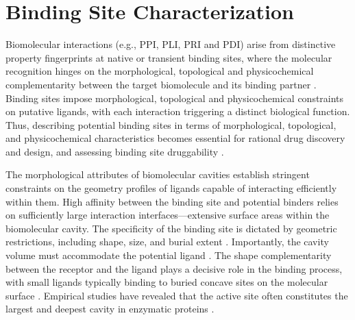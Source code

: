 \documentclass[Ingles]{phdthesis}
\def\eg{e.g.\onedot}
\begin{document}
\section{Binding Site Characterization \label{sec:biomolecular-characterization}}


Biomolecular interactions (\eg, PPI, PLI, PRI and PDI) arise from distinctive property fingerprints at native or transient binding sites, where the molecular recognition hinges on the morphological, topological and physicochemical complementarity between the target biomolecule and its binding partner \cite{sotriffer2002,henrich2010,guerra2019,krone2016}. Binding sites impose morphological, topological and physicochemical constraints on putative ligands, with each interaction triggering a distinct biological function. Thus, describing potential binding sites in terms of morphological, topological, and physicochemical characteristics becomes essential for rational drug discovery and design, and assessing binding site druggability \cite{hubbard1994,liang1998,guerra2019,krone2016}.

The morphological attributes of biomolecular cavities establish stringent constraints on the geometry profiles of ligands capable of interacting efficiently within them. High affinity between the binding site and potential binders relies on sufficiently large interaction interfaces---extensive surface areas within the biomolecular cavity. The specificity of the binding site is dictated by geometric restrictions, including shape, size, and burial extent \cite{laskowski1996,liang1998}. Importantly, the cavity volume must accommodate the potential ligand \cite{stank2016}. The shape complementarity between the receptor and the ligand plays a decisive role in the binding process, with small ligands typically binding to buried concave sites on the molecular surface \cite{henrich2010}. Empirical studies have revealed that the active site often constitutes the largest and deepest cavity in enzymatic proteins \cite{laskowski1996}.
\end{document}
